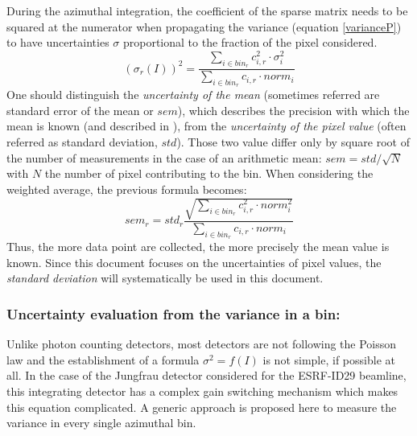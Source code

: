 \documentclass[preprint]{iucr}              %
\begin{document}
During the azimuthal integration, the coefficient of the sparse matrix needs to be squared at the numerator when propagating the variance (equation \ref{varianceP}) to have uncertainties $\sigma$ proportional to the fraction of the pixel considered.
\begin{equation}
\label{varianceP}
(\sigma_{r}(I))^2 = \frac{\sum\limits_{i \in bin_r} c_{i,r}^2 \cdot \sigma_i^2}
                  {\sum\limits_{i \in bin_r} c_{i,r} \cdot norm_i} 
\end{equation}
One should distinguish the \textit{uncertainty of the mean} (sometimes referred are standard error of the mean or $sem$), 
which describes the precision with which the mean is known (and described in ),
from the \textit{uncertainty of the pixel value} (often referred as standard deviation, $std$). 
Those two value differ only by square root of the number of measurements in the case of an arithmetic mean: $sem = std/\sqrt{N}$ with $N$ the number of pixel contributing to the bin.
When considering the weighted average, the previous formula becomes:
\begin{equation}
\label{sem}
sem_r = std_r \frac{\sqrt{\sum\limits_{i \in bin_r} c_{i,r}^2 \cdot norm_i^2}}{\sum\limits_{i \in bin_r} c_{i,r} \cdot norm_i}
\end{equation}
Thus, the more data point are collected, the more precisely the mean value is known.
Since this document focuses on the uncertainties of pixel values, the \textit{standard deviation} will systematically be used in this document.  

\subsubsection{Uncertainty evaluation from the variance in a bin:}

Unlike photon counting detectors, most detectors are not following the Poisson law and the establishment of a formula $\sigma^2 = f(I)$ is not simple, if possible at all. 
In the case of the Jungfrau detector considered for the ESRF-ID29 beamline, this integrating detector has a complex gain switching mechanism \cite{jungfrau_PSI} which makes this equation complicated.
A generic approach is proposed here to measure the variance in every single azimuthal bin.
\end{document}
